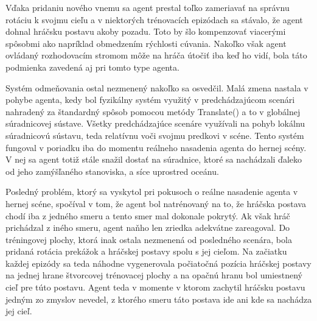 \documentclass[slovak, master]{diploma}
\begin{document}
Vďaka pridaniu nového vnemu sa agent prestal toľko zameriavať na správnu rotáciu k svojmu cieľu a v niektorých trénovacích epizódach sa stávalo, že agent dohnal hráčsku postavu akoby pozadu. Toto by šlo kompenzovať viacerými spôsobmi ako napríklad obmedzením rýchlosti cúvania. Nakoľko však agent ovládaný rozhodovacím stromom môže na hráča útočiť iba keď ho vidí, bola táto podmienka zavedená aj pri tomto type agenta. 

Systém odmeňovania ostal nezmenený nakoľko sa osvedčil. Malá zmena nastala v pohybe agenta, kedy bol fyzikálny systém využitý v predchádzajúcom scenári nahradený za štandardný spôsob pomocou metódy Translate() a to v globálnej súradnicovej sústave. Všetky predchádzajúce scenáre využívali na pohyb lokálnu súradnicovú sústavu, teda relatívnu voči svojmu predkovi v scéne. Tento systém fungoval v poriadku iba do momentu reálneho nasadenia agenta do hernej scény. V nej sa agent totiž stále snažil dostať na súradnice, ktoré sa nachádzali ďaleko od jeho zamýšľaného stanoviska, a síce uprostred oceánu.

Posledný problém, ktorý sa vyskytol pri pokusoch o reálne nasadenie agenta v hernej scéne, spočíval v tom, že agent bol natrénovaný na to, že hráčska postava chodí iba z jedného smeru a tento smer mal dokonale pokrytý. Ak však hráč prichádzal z iného smeru, agent naňho len zriedka adekvátne zareagoval. Do tréningovej plochy, ktorá inak ostala nezmenená od posledného scenára, bola pridaná rotácia prekážok a hráčskej postavy spolu s jej cieľom. Na začiatku každej epizódy sa teda náhodne vygenerovala počiatočná pozícia hráčskej postavy na jednej hrane štvorcovej trénovacej plochy a na opačnú hranu bol umiestnený cieľ pre túto postavu. Agent teda v momente v ktorom zachytil hráčsku postavu jedným zo zmyslov nevedel, z ktorého smeru táto postava ide ani kde sa nachádza jej cieľ.
\end{document}
